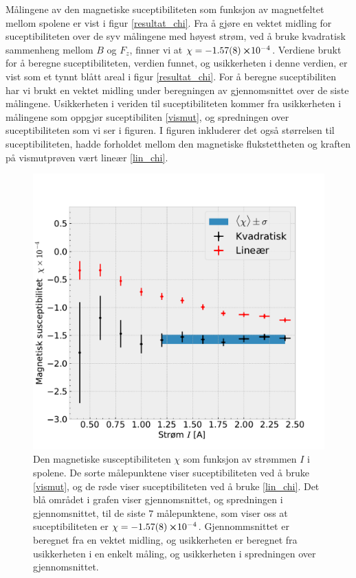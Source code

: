 \documentclass[%
 reprint,
 amsmath,amssymb,
 aps,
 norsk,
]{revtex4-1}
\begin{document}
Målingene av den magnetiske suceptibiliteten som funksjon av magnetfeltet mellom spolene er vist i figur \vref{resultat_chi}. Fra å gjøre en vektet midling for suceptibiliteten over de syv målingene med høyest strøm, ved å bruke kvadratisk sammenheng mellom $B$ og $F_z$, finner vi at $\chi = -\SI{1.57\pm0.08}\cross 10^{-4}$.
Verdiene brukt for å beregne suceptibiliteten, verdien funnet, og usikkerheten i denne verdien, er vist som et tynnt blått areal i figur \vref{resultat_chi}. For å beregne suceptibiliten har vi brukt en vektet midling under beregningen av gjennomsnittet over de siste målingene. Usikkerheten i veriden til suceptibiliteten kommer fra usikkerheten i målingene som oppgjør suceptibiliten \eqref{vismut}, og spredningen over suceptibiliteten som vi ser i figuren. I figuren inkluderer det også størrelsen til suceptibiliteten, hadde forholdet mellom den magnetiske flukstettheten og kraften på vismutprøven vært lineær \eqref{lin_chi}.
\begin{figure}[h!]
  \centering
  \includegraphics[scale=0.45]{chi_effekt.pdf}
  \caption{Den magnetiske susceptibiliteten $\chi$ som funksjon av strømmen $I$ i spolene. De sorte målepunktene viser suceptibiliteten ved å bruke \eqref{vismut}, og de røde viser suceptibiliteten ved å bruke \eqref{lin_chi}. Det blå området i grafen viser gjennomsnittet, og spredningen i gjennomsnittet, til de siste $7$ målepunktene, som viser oss at suceptibiliteten er $\chi = -\SI{1.57\pm0.08}\cross 10^{-4}$. Gjennommsnittet er beregnet fra en vektet midling, og usikkerheten er beregnet fra usikkerheten i en enkelt måling, og usikkerheten i spredningen over gjennomsnittet.}
  \label{resultat_chi}
\end{figure}
\end{document}
